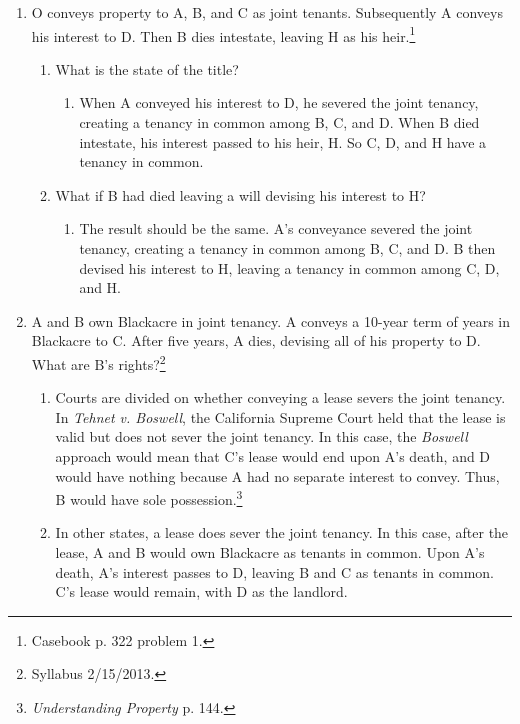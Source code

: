 \begin{enumerate}
    \item O conveys property to A, B, and C as joint tenants. Subsequently A 
    conveys his interest to D. Then B dies intestate, leaving H as his 
    heir.\footnote{Casebook p. 322 problem 1.}
    \begin{enumerate}
        \item What is the state of the title?
        \begin{enumerate}
            \item When A conveyed his interest to D, he severed the joint 
            tenancy, creating a tenancy in common among B, C, and D. When B 
            died intestate, his interest passed to his heir, H. So C, D, and H 
            have a tenancy in common.
        \end{enumerate}
        \item What if B had died leaving a will devising his interest to H?
        \begin{enumerate}
            \item The result should be the same. A's conveyance severed the 
            joint tenancy, creating a tenancy in common among B, C, and D. B 
            then devised his interest to H, leaving a tenancy in common among 
            C, D, and H.
        \end{enumerate}
    \end{enumerate}
    \item A and B own Blackacre in joint tenancy. A conveys a 10-year term of 
    years in Blackacre to C. After five years, A dies, devising all of his 
    property to D. What are B's rights?\footnote{Syllabus 2/15/2013.}
    \begin{enumerate}
        \item Courts are divided on whether conveying a lease severs the joint 
        tenancy. In \emph{Tehnet v. Boswell}, the California Supreme Court 
        held that the lease is valid but does not sever the joint tenancy. In 
        this case, the \emph{Boswell} approach would mean that C's lease would 
        end upon A's death, and D would have nothing because A had no separate 
        interest to convey. Thus, B would have sole 
        possession.\footnote{\emph{Understanding Property} p. 144.}
        \item In other states, a lease does sever the joint tenancy. In this 
        case, after the lease, A and B would own Blackacre as tenants in 
        common. Upon A's death, A's interest passes to D, leaving B and C as 
        tenants in common. C's lease would remain, with D as the landlord.
    \end{enumerate}
\end{enumerate}


